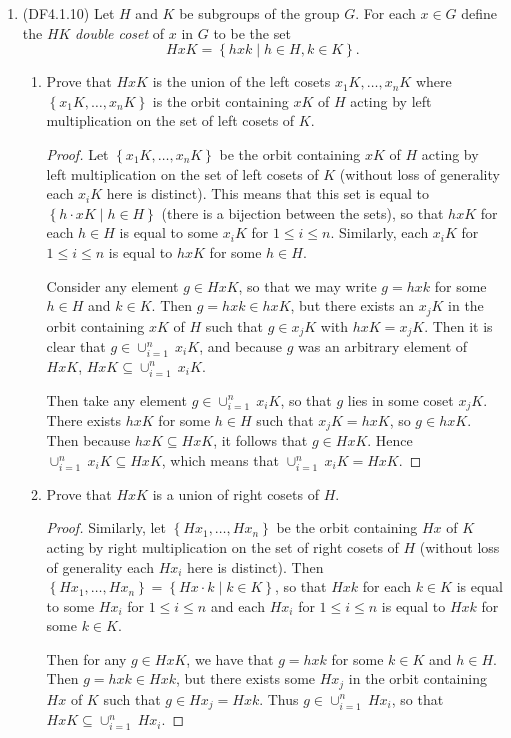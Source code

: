 \documentclass[11pt]{article}
\newcommand{\cbr}[1]{\left\{#1\right\}}
\begin{document}
\begin{enumerate}
    \item (DF4.1.10) Let $H$ and $K$ be subgroups of the group $G$. For each $x\in G$ define the $HK$ \textit{double coset} of $x$ in $G$ to be the set \[HxK = \cbr{hxk \mid h\in H,k\in K}.\]
    \begin{enumerate}[label=\textbf{(\alph*)}]
        \item Prove that $HxK$ is the union of the left cosets $x_1K,\dots,x_nK$ where $\cbr{x_1K,\dots,x_nK}$ is the orbit containing $xK$ of $H$ acting by left multiplication on the set of left cosets of $K$.
        \begin{proof}
            Let $\cbr{x_1K,\dots,x_nK}$ be the orbit containing $xK$ of $H$ acting by left multiplication on the set of left cosets of $K$ (without loss of generality each $x_iK$ here is distinct). This means that this set is equal to $\cbr{h\cdot xK \mid h\in H}$ (there is a bijection between the sets), so that $hxK$ for each $h\in H$ is equal to some $x_iK$ for $1\leq i\leq n$. Similarly, each $x_iK$ for $1\leq i\leq n$ is equal to $hxK$ for some $h\in H$.
            
            Consider any element $g\in HxK$, so that we may write $g = hxk$ for some $h\in H$ and $k\in K$. Then $g = hxk\in hxK$, but there exists an $x_jK$ in the orbit containing $xK$ of $H$ such that $g\in x_jK$ with $hxK = x_jK$. Then it is clear that $g \in \cup_{i=1}^n~x_iK$, and because $g$ was an arbitrary element of $HxK$, $HxK\subseteq \cup_{i=1}^n~x_iK$.

            Then take any element $g\in \cup_{i=1}^n~x_iK$, so that $g$ lies in some coset $x_jK$. There exists $hxK$ for some $h\in H$ such that $x_jK = hxK$, so $g\in hxK$. Then because $hxK\subseteq HxK$, it follows that $g\in HxK$. Hence $\cup_{i=1}^n~x_iK\subseteq HxK$, which means that $\cup_{i=1}^n~x_iK = HxK$.
        \end{proof}
        \item Prove that $HxK$ is a union of right cosets of $H$.
        \begin{proof}
            Similarly, let $\cbr{Hx_1,\dots,Hx_n}$ be the orbit containing $Hx$ of $K$ acting by right multiplication on the set of right cosets of $H$ (without loss of generality each $Hx_i$ here is distinct). Then $\cbr{Hx_1,\dots,Hx_n} = \cbr{Hx \cdot k \mid k\in K}$, so that $Hxk$ for each $k\in K$ is equal to some $Hx_i$ for $1\leq i\leq n$ and each $Hx_i$ for $1\leq i \leq n$ is equal to $Hxk$ for some $k\in K$.

            Then for any $g\in HxK$, we have that $g = hxk$ for some $k\in K$ and $h\in H$. Then $g = hxk\in Hxk$, but there exists some $Hx_j$ in the orbit containing $Hx$ of $K$ such that $g\in Hx_j = Hxk$. Thus $g\in \cup_{i=1}^n~ Hx_i$, so that $HxK\subseteq \cup_{i=1}^n~ Hx_i$.


\end{proof}
\end{enumerate}
\end{enumerate}
\end{document}
